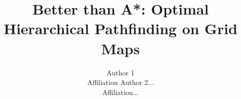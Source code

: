 \documentclass{article}
\begin{document}
\title{Better than A*: Optimal Hierarchical Pathfinding on Grid Maps}
\author{
Author 1\\
Affiliation
\And
Author 2...\\
Affiliation...
}
\maketitle






%





\end{document}

